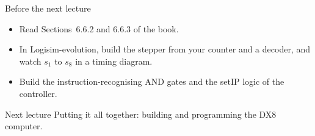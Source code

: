 \documentclass[10pt]{wosm-slides}
\begin{document}
\begin{frame}{Before the next lecture}
  \begin{itemize}
    \item Read Sections~6.6.2 and 6.6.3 of the book.
    \item In Logisim-evolution, build the stepper from your counter and a decoder, and
      watch $s_1$ to $s_8$ in a timing diagram.
    \item Build the instruction-recognising AND gates and the setIP logic of the
      controller.
  \end{itemize}

  \begin{block}{Next lecture }
    Putting it all together: building and programming the DX8 computer.
  \end{block}
\end{frame}
\end{document}
